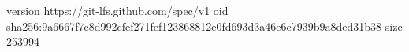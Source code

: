 version https://git-lfs.github.com/spec/v1
oid sha256:9a6667f7e8d992cfef271fef123868812e0fd693d3a46e6c7939b9a8ded31b38
size 253994
